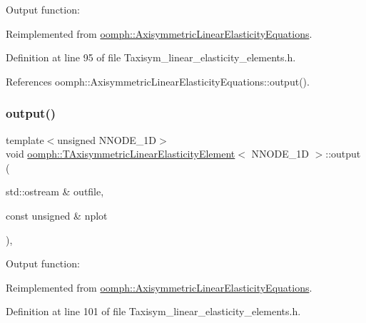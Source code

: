 Output function\+: 



Reimplemented from \hyperlink{classoomph_1_1AxisymmetricLinearElasticityEquations_a798627057a8d79bccc17d277e1717f67}{oomph\+::\+Axisymmetric\+Linear\+Elasticity\+Equations}.



Definition at line 95 of file Taxisym\+\_\+linear\+\_\+elasticity\+\_\+elements.\+h.



References oomph\+::\+Axisymmetric\+Linear\+Elasticity\+Equations\+::output().

\mbox{\label{classoomph_1_1TAxisymmetricLinearElasticityElement_aa56d730cdb3e5e31f4edeb9d270c8218}} 
\subsubsection{\texorpdfstring{output()}{output()}\hspace{0.1cm}{\footnotesize\ttfamily [2/4]}}
{\footnotesize\ttfamily template$<$unsigned N\+N\+O\+D\+E\+\_\+1D$>$ \\
void \hyperlink{classoomph_1_1TAxisymmetricLinearElasticityElement}{oomph\+::\+T\+Axisymmetric\+Linear\+Elasticity\+Element}$<$ N\+N\+O\+D\+E\+\_\+1D $>$\+::output (\begin{DoxyParamCaption}\item[{std\+::ostream \&}]{outfile,  }\item[{const unsigned \&}]{nplot }\end{DoxyParamCaption})\hspace{0.3cm}{\ttfamily [inline]}, {\ttfamily [virtual]}}



Output function\+: 



Reimplemented from \hyperlink{classoomph_1_1AxisymmetricLinearElasticityEquations_a55d90a70997efe0a5cf34e269e0cf6b8}{oomph\+::\+Axisymmetric\+Linear\+Elasticity\+Equations}.



Definition at line 101 of file Taxisym\+\_\+linear\+\_\+elasticity\+\_\+elements.\+h.



